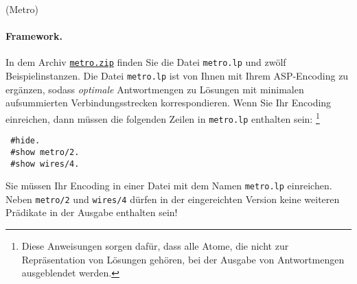 \documentclass[a4paper,12pt,ngerman]{article}
\begin{document}
\begin{PraktikumsAufgabe}{2}{(Metro)}


\paragraph{Framework.}

\noindent
In dem Archiv \href{http://www.cs.uni-potsdam.de/wv/lehre/11WS/11-Antwortprog/metro.zip}{\texttt{metro.zip}} finden Sie die Datei \texttt{metro.lp} und zwölf Beispielinstanzen.
Die Datei \texttt{metro.lp} ist von Ihnen mit Ihrem ASP-Encoding zu ergänzen,
sodass \emph{optimale} Antwortmengen zu Lösungen mit minimalen aufsummierten
Verbindungsstrecken korrespondieren.
Wenn Sie Ihr Encoding einreichen,
dann müssen die folgenden Zeilen in \texttt{metro.lp} enthalten sein:%
\footnote{Diese Anweisungen sorgen dafür, dass alle Atome, die nicht zur Repräsentation von Lösungen gehören, bei der Ausgabe von Antwortmengen ausgeblendet werden.}
\vspace{-1mm}
\begin{verbatim}
 #hide.
 #show metro/2.
 #show wires/4.
\end{verbatim}
\vspace{-1mm}
{\small\sf Sie m\"ussen Ihr Encoding in einer Datei mit dem Namen \texttt{metro.lp}
           einreichen.
           Neben \texttt{metro/2} und \texttt{wires/4} d\"urfen in der eingereichten Version keine weiteren
           Pr\"adikate in der Ausgabe enthalten    sein!}%


\end{PraktikumsAufgabe}
\end{document}
